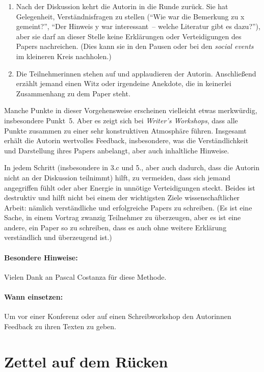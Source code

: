 \begin{enumerate}
\item Nach der Diskussion kehrt die Autorin in die Runde zurück. Sie hat
Gelegenheit, Verständnisfragen zu stellen ("`Wie war die Bemerkung zu x
gemeint?"', "`Der Hinweis y war interessant~-- welche Literatur gibt es
dazu?"'), aber sie darf an dieser Stelle keine Erklärungen oder Verteidigungen des
Papers nachreichen. (Dies kann sie in den Pausen oder bei den \emph{social
events} im kleineren Kreis nachholen.)

\item Die Teilnehmerinnen stehen auf und applaudieren der Autorin.
Anschließend erzählt jemand einen Witz oder irgendeine Anekdote, die
in keinerlei Zusammenhang zu dem Paper steht.
\end{enumerate}

Manche Punkte in dieser Vorgehensweise erscheinen vielleicht etwas
merkwürdig, insbesondere Punkt~5. Aber es zeigt sich bei \emph{Writer's Workshops},
dass alle Punkte zusammen zu einer sehr konstruktiven
Atmosphäre führen. Insgesamt erhält die Autorin wertvolles Feedback,
insbesondere, was die Verständlichkeit und Darstellung ihres Papers anbelangt,
aber auch inhaltliche Hinweise.

In jedem Schritt (insbesondere in 3.c und 5., aber auch dadurch, dass die
Autorin nicht an der Diskussion teilnimmt) hilft, zu vermeiden, dass sich
jemand angegriffen fühlt oder aber Energie in unnötige Verteidigungen steckt. Beides ist destruktiv und hilft nicht bei einem der wichtigsten Ziele wissenschaftlicher Arbeit: nämlich verständliche und
erfolgreiche Papers zu schreiben. (Es ist eine Sache, in einem Vortrag
zwanzig Teilnehmer zu überzeugen, aber es ist eine andere, ein Paper so
zu schreiben, dass es auch ohne weitere Erklärung verständlich und
überzeugend ist.)

\paragraph{Besondere Hinweise:} Vielen Dank an Pascal Costanza für diese Methode.
\paragraph{Wann einsetzen:} Um vor einer Konferenz oder auf einen Schreibworkshop den Autorinnen Feedback zu ihren Texten zu geben.

\section{Zettel auf dem Rücken}
